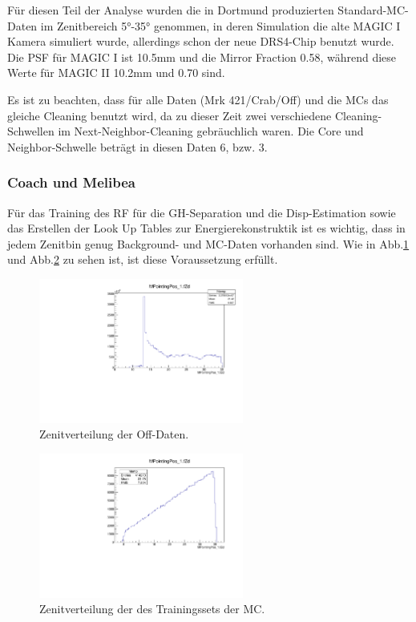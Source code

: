 Für diesen Teil der Analyse wurden die in Dortmund produzierten Standard-MC-Daten im Zenitbereich 5°-35° genommen, in deren Simulation die alte MAGIC I Kamera simuliert wurde, allerdings schon der neue DRS4-Chip benutzt wurde.
Die PSF für MAGIC I ist 10.5mm und die Mirror Fraction 0.58, während diese Werte für MAGIC II 10.2mm und 0.70 sind.

Es ist zu beachten, dass für alle Daten (Mrk 421/Crab/Off) und die MCs das gleiche Cleaning benutzt wird, da zu dieser Zeit zwei verschiedene Cleaning-Schwellen im Next-Neighbor-Cleaning gebräuchlich waren.
Die Core und Neighbor-Schwelle beträgt in diesen Daten 6, bzw. 3.


\subsubsection{Coach und Melibea}
Für das Training des RF für die GH-Separation und die Disp-Estimation sowie das Erstellen der Look Up Tables zur Energierekonstruktik ist es wichtig, dass in jedem Zenitbin genug Background- und MC-Daten vorhanden sind.
Wie in Abb.\ref{Datenset2_Zenitverteilung_Off} und Abb.\ref{Datenset2_Zenitverteilung_MC} zu sehen ist, ist diese Voraussetzung erfüllt.

\begin{figure}
    \centering
    \includegraphics[width=0.6\textwidth]{./Plots/04_MrkAnalyse/Datenset2/Part2_2_Background_Zenith.pdf}
    \caption{Zenitverteilung der Off-Daten.}
    \label{Datenset2_Zenitverteilung_Off}
\end{figure}

\begin{figure}
    \centering
    \includegraphics[width=0.6\textwidth]{./Plots/04_MrkAnalyse/Datenset2/MPointingPos_1.fZd.pdf}
    \caption{Zenitverteilung der des Trainingssets der MC.}
    \label{Datenset2_Zenitverteilung_MC}
\end{figure}

